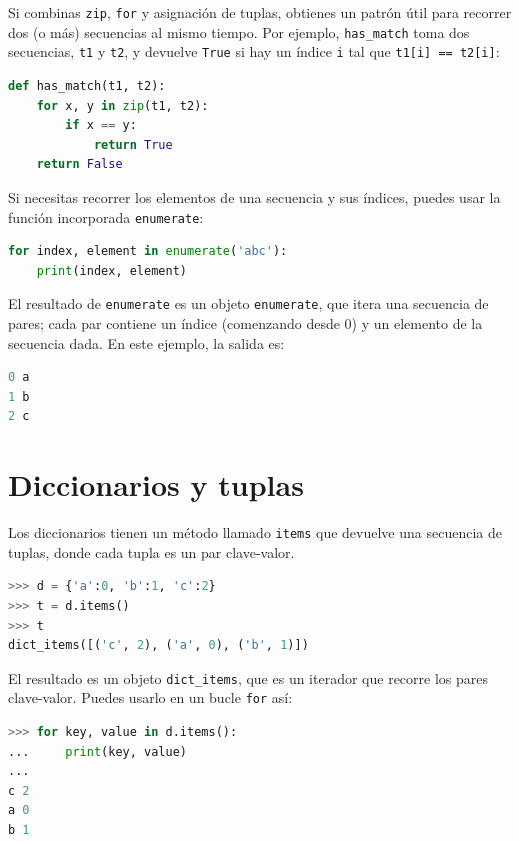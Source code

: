 Si combinas \texttt{zip}, \texttt{for} y asignación de tuplas, obtienes un patrón útil para recorrer dos (o más) secuencias al mismo tiempo. Por ejemplo, \texttt{has\_match} toma dos secuencias, \texttt{t1} y \texttt{t2}, y devuelve \texttt{True} si hay un índice \texttt{i} tal que \texttt{t1[i] == t2[i]}:

\begin{lstlisting}[language=Python]
def has_match(t1, t2):
    for x, y in zip(t1, t2):
        if x == y:
            return True
    return False
\end{lstlisting}

Si necesitas recorrer los elementos de una secuencia y sus índices, puedes usar la función incorporada \texttt{enumerate}:

\begin{lstlisting}[language=Python]
for index, element in enumerate('abc'):
    print(index, element)
\end{lstlisting}

El resultado de \texttt{enumerate} es un objeto \texttt{enumerate}, que itera una secuencia de pares; cada par contiene un índice (comenzando desde 0) y un elemento de la secuencia dada. En este ejemplo, la salida es:

\begin{lstlisting}[language=Python]
0 a
1 b
2 c
\end{lstlisting}

\section{Diccionarios y tuplas}

Los diccionarios tienen un método llamado \texttt{items} que devuelve una secuencia de tuplas, donde cada tupla es un par clave-valor.

\begin{lstlisting}[language=Python]
>>> d = {'a':0, 'b':1, 'c':2}
>>> t = d.items()
>>> t
dict_items([('c', 2), ('a', 0), ('b', 1)])
\end{lstlisting}

El resultado es un objeto \texttt{dict\_items}, que es un iterador que recorre los pares clave-valor. Puedes usarlo en un bucle \texttt{for} así:

\begin{lstlisting}[language=Python]
>>> for key, value in d.items():
...     print(key, value)
...
c 2
a 0
b 1
\end{lstlisting}

